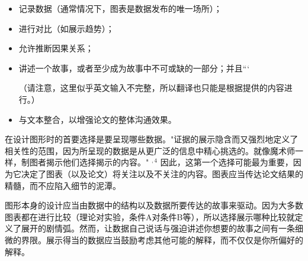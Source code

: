 \begin{itemize}
\item 记录数据（通常情况下，图表是数据发布的唯一场所）；
\item 进行对比（如展示趋势）；
\item 允许推断因果关系；
\item 讲述一个故事，或者至少成为故事中不可或缺的一部分；并且``` 

（请注意，这里似乎英文输入不完整，所以翻译也只能是根据提供的内容进行。）
\item 与文本整合，以增强论文的整体沟通效果。
\end{itemize}

在设计图形时的首要选择是要呈现哪些数据。"证据的展示隐含而又强烈地定义了相关性的范围，因为所呈现的数据是从更广泛的信息中精心挑选的。就像魔术师一样，制图者揭示他们选择揭示的内容。" ${ }^{, 4}$ 因此，这第一个选择可能最为重要，因为它决定了图表（以及论文）将关注以及不关注的内容。图表应当传达论文结果的精髓，而不应陷入细节的泥潭。

图形本身的设计应当由数据中的结构以及数据所要传达的故事来驱动。因为大多数图表都在进行比较（理论对实验，条件A对条件B等），所以选择展示哪种比较就定义了展开的剧情弧。然而，让数据自己说话与强迫讲述你想要的故事之间有一条细微的界限。展示得当的数据应当鼓励考虑其他可能的解释，而不仅仅是你所偏好的解释。

